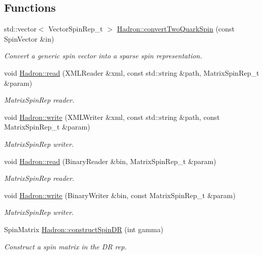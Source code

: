 \subsection*{Functions}
\begin{DoxyCompactItemize}
\item 
std\+::vector$<$ Vector\+Spin\+Rep\+\_\+t $>$ \mbox{\hyperlink{namespaceHadron_a87528a5f45980257a1473a3f77301a5b}{Hadron\+::convert\+Two\+Quark\+Spin}} (const Spin\+Vector \&in)
\begin{DoxyCompactList}\small\item\em Convert a generic spin vector into a sparse spin representation. \end{DoxyCompactList}\item 
void \mbox{\hyperlink{namespaceHadron_ad46ef728c9d609cbf63217c66bdf0285}{Hadron\+::read}} (X\+M\+L\+Reader \&xml, const std\+::string \&path, Matrix\+Spin\+Rep\+\_\+t \&param)
\begin{DoxyCompactList}\small\item\em Matrix\+Spin\+Rep reader. \end{DoxyCompactList}\item 
void \mbox{\hyperlink{namespaceHadron_a433908e65befd36f268196398b8469c7}{Hadron\+::write}} (X\+M\+L\+Writer \&xml, const std\+::string \&path, const Matrix\+Spin\+Rep\+\_\+t \&param)
\begin{DoxyCompactList}\small\item\em Matrix\+Spin\+Rep writer. \end{DoxyCompactList}\item 
void \mbox{\hyperlink{namespaceHadron_af8ce56081c184ce7dd924a192bff08a6}{Hadron\+::read}} (Binary\+Reader \&bin, Matrix\+Spin\+Rep\+\_\+t \&param)
\begin{DoxyCompactList}\small\item\em Matrix\+Spin\+Rep reader. \end{DoxyCompactList}\item 
void \mbox{\hyperlink{namespaceHadron_ae38baf2d1cfe9fdaf455f274e722b32f}{Hadron\+::write}} (Binary\+Writer \&bin, const Matrix\+Spin\+Rep\+\_\+t \&param)
\begin{DoxyCompactList}\small\item\em Matrix\+Spin\+Rep writer. \end{DoxyCompactList}\item 
Spin\+Matrix \mbox{\hyperlink{namespaceHadron_add425eaa856f87203aaf3bd1e3eb086d}{Hadron\+::construct\+Spin\+DR}} (int gamma)
\begin{DoxyCompactList}\small\item\em Construct a spin matrix in the DR rep. \end{DoxyCompactList}\item 

\end{DoxyCompactItemize}
